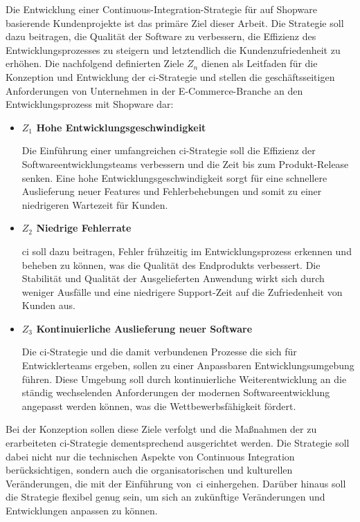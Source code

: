 Die Entwicklung einer Continuous-Integration-Strategie für auf Shopware basierende Kundenprojekte ist das primäre Ziel
dieser Arbeit.
Die Strategie soll dazu beitragen, die Qualität der Software zu verbessern, die Effizienz des Entwicklungsprozesses zu
steigern und letztendlich die Kundenzufriedenheit zu erhöhen.
Die nachfolgend definierten Ziele $Z_n$ dienen als Leitfaden für die Konzeption und Entwicklung der
\acrshort{ci}-Strategie und stellen die geschäftsseitigen Anforderungen von Unternehmen in der E-Commerce-Branche an den
Entwicklungsprozess mit Shopware dar:

\begin{itemize}
    \item {
        \textbf{$Z_1$ Hohe Entwicklungsgeschwindigkeit}\par
        Die Einführung einer umfangreichen \acrshort{ci}-Strategie soll die Effizienz der Softwareentwicklungsteams
        verbessern und die Zeit bis zum Produkt-Release senken.
        Eine hohe Entwicklungsgeschwindigkeit sorgt für eine schnellere Auslieferung neuer Features und Fehlerbehebungen
        und somit zu einer niedrigeren Wartezeit für Kunden.
    }

    \item {
        \textbf{$Z_2$ Niedrige Fehlerrate}\par
        \acrshort{ci} soll dazu beitragen, Fehler frühzeitig im Entwicklungsprozess erkennen und beheben zu können, was
        die Qualität des Endprodukts verbessert.
        Die Stabilität und Qualität der Ausgelieferten Anwendung wirkt sich durch weniger Ausfälle und eine
        niedrigere Support-Zeit auf die Zufriedenheit von Kunden aus.
    }

    \item{
        \textbf{$Z_3$ Kontinuierliche Auslieferung neuer Software}\par
        Die \acrshort{ci}-Strategie und die damit verbundenen Prozesse die sich für Entwicklerteams ergeben, sollen
        zu einer Anpassbaren Entwicklungsumgebung führen.
        Diese Umgebung soll durch kontinuierliche Weiterentwicklung an die ständig wechselenden Anforderungen der
        modernen Softwareentwicklung angepasst werden können, was die Wettbewerbsfähigkeit fördert.
    }
\end{itemize}

Bei der Konzeption sollen diese Ziele verfolgt und die Maßnahmen der zu erarbeiteten \acrshort{ci}-Strategie
dementsprechend ausgerichtet werden.
Die Strategie soll dabei nicht nur die technischen Aspekte von Continuous Integration berücksichtigen, sondern auch die
organisatorischen und kulturellen Veränderungen, die mit der Einführung von\ \acrshort{ci} einhergehen.
Darüber hinaus soll die Strategie flexibel genug sein, um sich an zukünftige Veränderungen und Entwicklungen anpassen
zu können.

